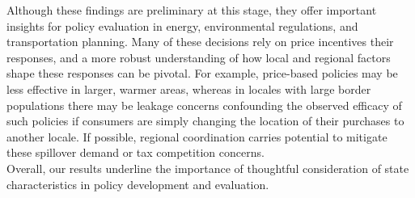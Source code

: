 Although these findings are preliminary at this stage, they offer important insights for policy evaluation in energy, environmental regulations, and transportation planning. Many of these decisions rely on price incentives their responses, and a more robust understanding of how local and regional factors shape these responses can be pivotal. For example, price-based policies may be less effective in larger, warmer areas, whereas in locales with large border populations there may be leakage concerns confounding the observed efficacy of such policies if consumers are simply changing the location of their purchases to another locale. If possible, regional coordination carries potential to mitigate these spillover demand or tax competition concerns. \\ 

Overall, our results underline the importance of thoughtful consideration of state characteristics in policy development and evaluation. 
